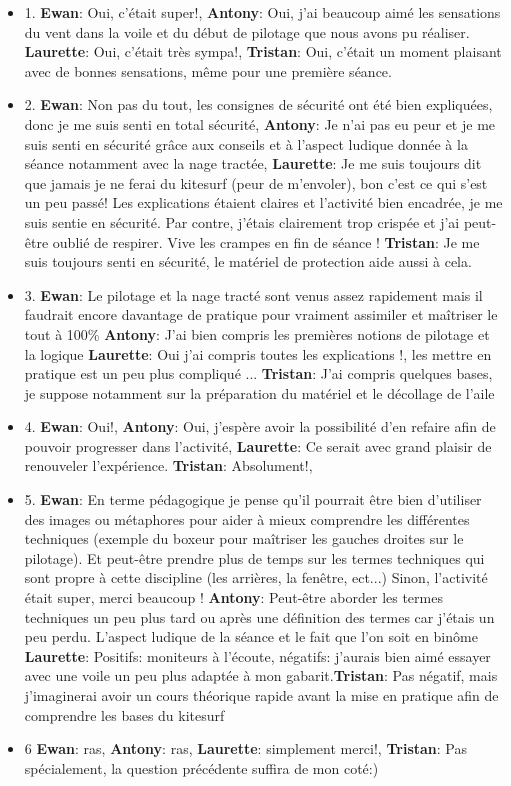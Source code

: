 \documentclass[11pt,a4paper]{report}
\begin{document}
\begin{itemize}
\item 1. \textbf{Ewan}: Oui, c'était super!, \textbf{Antony}: Oui, j'ai
beaucoup aimé les sensations du vent  dans la voile et du début de
pilotage que nous avons  pu réaliser.                                      
\textbf{Laurette}: Oui, c'était très sympa!, \textbf{Tristan}: Oui,
c'était un moment plaisant avec de bonnes sensations, m\^eme pour
une première séance.
\item 2. \textbf{Ewan}: Non pas du tout, les consignes de sécurité
ont été bien expliquées, donc je me suis senti en total sécurité,
\textbf{Antony}: Je n'ai pas eu peur et je me suis senti en
sécurité gr\^ace aux conseils et à l'aspect ludique donnée à la séance 
notamment avec la nage tractée, \textbf{Laurette}: Je me suis
toujours dit que jamais je ne ferai du kitesurf (peur de m'envoler),
bon c'est ce qui s'est un peu passé! Les explications étaient 
claires et l'activité bien encadrée, je me suis sentie en sécurité.
Par contre, j'étais clairement trop crispée et j'ai peut-\^etre
oublié de respirer. Vive les crampes en fin de séance ! 
\textbf{Tristan}: Je me suis toujours senti en sécurité, le matériel
de protection aide aussi à cela.
\item 3. \textbf{Ewan}: Le pilotage et la nage tracté sont venus
assez rapidement mais il faudrait encore davantage de pratique
pour vraiment assimiler et maîtriser le tout à 100\%
\textbf{Antony}: J'ai bien compris les premières notions de
pilotage et la logique \textbf{Laurette}: Oui j'ai compris
toutes les explications !, les mettre en pratique est un
peu plus compliqué ...
\textbf{Tristan}: J'ai compris quelques bases, je suppose
notamment sur la préparation du matériel et le décollage de l'aile
\item 4. \textbf{Ewan}: Oui!, \textbf{Antony}: Oui, j'espère
avoir la possibilité d'en refaire afin de pouvoir progresser
dans l'activité, \textbf{Laurette}: Ce serait avec grand plaisir
de renouveler l'expérience.
\textbf{Tristan}: Absolument!, 
\item 5. \textbf{Ewan}: En terme pédagogique je pense qu'il
pourrait \^etre bien d'utiliser des images ou métaphores pour
aider à mieux comprendre les différentes techniques (exemple
du boxeur pour maîtriser les gauches droites sur le  pilotage).
Et peut-\^etre prendre plus de temps sur les termes techniques
qui sont propre à cette discipline (les arrières, la fen\^etre, ect...) 
Sinon, l'activité était super, merci beaucoup !
\textbf{Antony}: Peut-\^etre aborder les termes techniques un 
peu plus tard ou après une définition des termes car j'étais un
peu perdu. L'aspect ludique de la séance et le fait que l'on
soit en bin\^ome \textbf{Laurette}: Positifs: moniteurs à
l'écoute, négatifs: j'aurais bien aimé essayer avec une
voile un peu plus adaptée à mon gabarit.\textbf{Tristan}: 
Pas négatif, mais j'imaginerai avoir un cours théorique rapide avant
la mise en pratique afin de comprendre les bases du kitesurf
\item 6 \textbf{Ewan}: ras, \textbf{Antony}: ras, 
\textbf{Laurette}: simplement merci!, \textbf{Tristan}: 
Pas spécialement, la question précédente suffira de mon coté:)
\end{itemize}
\end{document}
